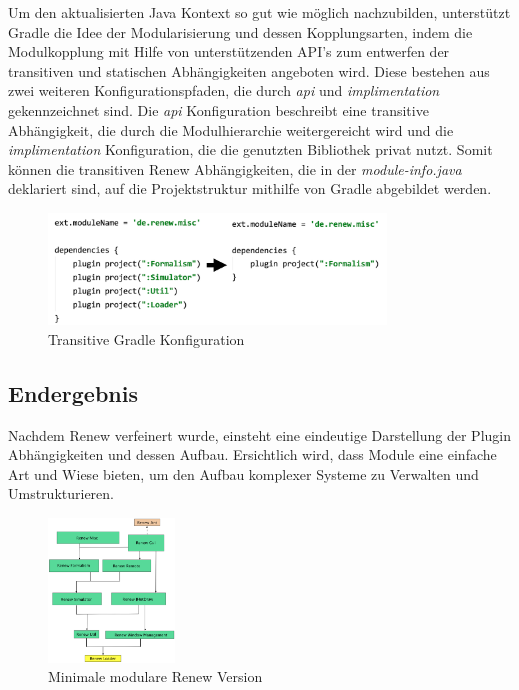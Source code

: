 	Um den aktualisierten Java Kontext so gut wie möglich nachzubilden, unterstützt Gradle die Idee der  Modularisierung und dessen Kopplungsarten, indem die Modulkopplung mit Hilfe von unterstützenden API's zum entwerfen der transitiven und statischen Abhängigkeiten angeboten wird. Diese bestehen aus zwei weiteren Konfigurationspfaden, die durch \textit{api} und \textit{implimentation} gekennzeichnet sind. Die \textit{api} Konfiguration beschreibt eine transitive Abhängigkeit, die durch die Modulhierarchie weitergereicht wird und die \textit{implimentation} Konfiguration, die die genutzten Bibliothek privat nutzt. Somit können die transitiven Renew Abhängigkeiten, die in der \textit{module-info.java} deklariert sind, auf die Projektstruktur mithilfe von Gradle abgebildet werden. 

	\begin{figure}[h!]
	  \centering
	  \includegraphics[width=0.8\textwidth]{material/images/gradle_misc.png}
	  \caption{Transitive Gradle Konfiguration}
	  \label{fig:trans_gradle}
	\end{figure}

\subsection{Endergebnis} \label{sub:endergebnis}
	
	Nachdem Renew verfeinert wurde, einsteht eine eindeutige Darstellung der Plugin Abhängigkeiten und dessen Aufbau. Ersichtlich wird, dass Module eine einfache Art und Wiese bieten, um den Aufbau komplexer Systeme zu Verwalten und Umstrukturieren.

	\begin{figure}[h!]
	  \centering
	  \includegraphics[width=0.3\textwidth]{material/images/tree_trans.png}
	  \caption{Minimale modulare Renew Version}
	  \label{fig:trans_config}
	\end{figure}









